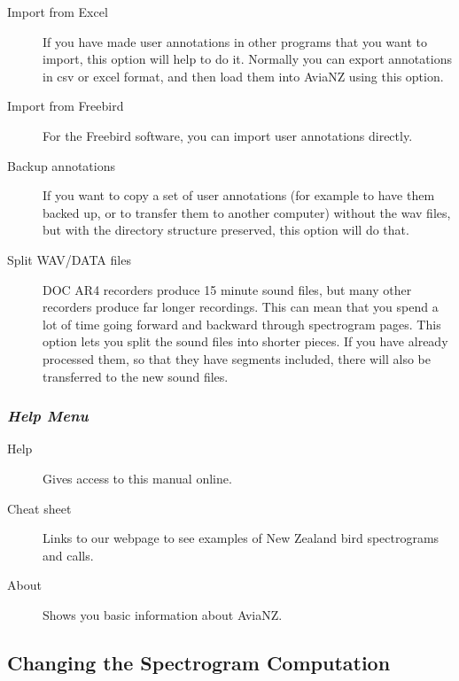 \documentclass{article}
\begin{document}
\begin{description}
\item [Import from Excel] If you have made user annotations in other programs that you want to import, this option will help to do it. Normally you can export annotations in csv or excel format, and then load them into AviaNZ using this option.
\item [Import from Freebird] For the Freebird software, you can import user annotations directly.
\item[Backup annotations] If you want to copy a set of user annotations (for example to have them backed up, or to transfer them to another computer) without the wav files, but with the directory structure preserved, this option will do that. 
\item[Split WAV/DATA files] DOC AR4 recorders produce 15 minute sound files, but many other recorders produce far longer recordings. This can mean that you spend a lot of time going forward and backward through spectrogram pages. This option lets you split the sound files into shorter pieces. If you have already processed them, so that they have segments included, there will also be transferred to the new sound files.
\end{description}

\subsubsection{{\em Help Menu}}

\begin{description}
\item [Help] Gives access to this manual online.
\item [Cheat sheet] Links to our webpage to see examples of New Zealand bird spectrograms and calls.
\item[About] Shows you basic information about AviaNZ.
\end{description}

\subsection{Changing the Spectrogram Computation}\label{sec:spectrogram2}
\end{document}
